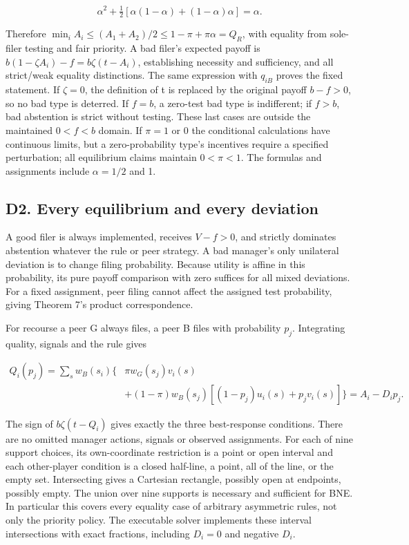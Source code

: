\documentclass[
  11pt,
]{article}
\begin{document}
\[\alpha^2+\tfrac12[\alpha(1-\alpha)+(1-\alpha)\alpha]=\alpha.\]

Therefore \(\min_i A_i\leq(A_1+A_2)/2\leq1-\pi+\pi\alpha=Q_R\), with
equality from sole-filer testing and fair priority. A bad filer's
expected payoff is \(b(1-\zeta A_i)-f=b\zeta(t-A_i)\), establishing
necessity and sufficiency, and all strict/weak equality distinctions.
The same expression with \(q_{iB}\) proves the fixed statement. If
\(\zeta=0\), the definition of t is replaced by the original payoff
\(b-f>0\), so no bad type is deterred. If \(f=b\), a zero-test bad type
is indifferent; if \(f>b\), bad abstention is strict without testing.
These last cases are outside the maintained \(0<f<b\) domain. If
\(\pi=1\) or 0 the conditional calculations have continuous limits, but
a zero-probability type's incentives require a specified perturbation;
all equilibrium claims maintain \(0<\pi<1\). The formulas and
assignments include \(\alpha=1/2\) and 1.

\subsection{D2. Every equilibrium and every
deviation}\label{d2.-every-equilibrium-and-every-deviation}

A good filer is always implemented, receives \(V-f>0\), and strictly
dominates abstention whatever the rule or peer strategy. A bad manager's
only unilateral deviation is to change filing probability. Because
utility is affine in this probability, its pure payoff comparison with
zero suffices for all mixed deviations. For a fixed assignment, peer
filing cannot affect the assigned test probability, giving Theorem 7's
product correspondence.

For recourse a peer G always files, a peer B files with probability
\(p_j\). Integrating quality, signals and the rule gives

\[\begin{split}
Q_i(p_j)=\sum_s w_B(s_i)\{&\pi w_G(s_j)v_i(s)\\
&+(1-\pi)w_B(s_j)[(1-p_j)u_i(s)+p_jv_i(s)]\}
=A_i-D_i p_j.
\end{split}\]

The sign of \(b\zeta(t-Q_i)\) gives exactly the three best-response
conditions. There are no omitted manager actions, signals or observed
assignments. For each of nine support choices, its own-coordinate
restriction is a point or open interval and each other-player condition
is a closed half-line, a point, all of the line, or the empty set.
Intersecting gives a Cartesian rectangle, possibly open at endpoints,
possibly empty. The union over nine supports is necessary and sufficient
for BNE. In particular this covers every equality case of arbitrary
asymmetric rules, not only the priority policy. The executable solver
implements these interval intersections with exact fractions, including
\(D_i=0\) and negative \(D_i\).
\end{document}
